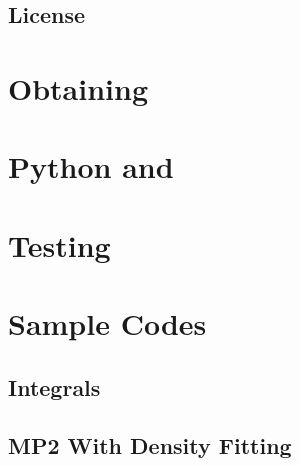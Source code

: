 \documentclass[12pt]{article}
\begin{document}
    \subsection{License} \label{license}
    
\section{Obtaining \PSIfour} \label{svn}
    
\section{Python and \PSIfour} \label{python}
    
\section{Testing} \label{testing}
    
\section{Sample Codes} \label{sample-codes}
    
    \subsection{Integrals} \label{integrals}
    
    \subsection{MP2 With Density Fitting} \label{df-mp2}
    

\newpage
\appendix
\end{document}
